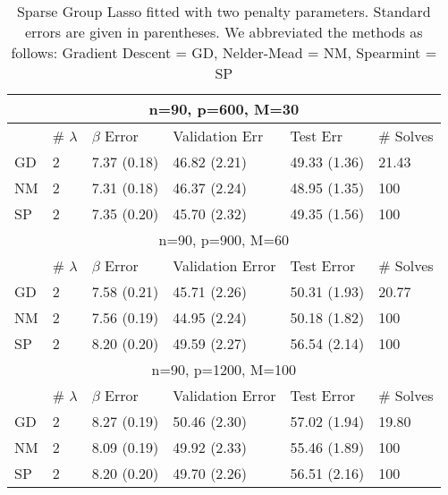 \documentclass[12pt,letterpaper]{article}
\begin{document}
\begin{table}
\caption{\label{table:two_param_sgl} Sparse Group Lasso fitted with two penalty parameters. Standard errors are given in parentheses. We abbreviated the methods as follows: Gradient Descent = GD, Nelder-Mead = NM, Spearmint = SP}
\centering
\begin{tabular}{| l | l | l | l | l | l | }
	\hline
	\multicolumn{6}{|c|}{n=90, p=600, M=30}\\
	\hline
	& \# $\lambda$ & $\beta$ Error & Validation Err & Test Err & \# Solves \\
	\hline
	GD & 2 & 7.37 (0.18) & 46.82 (2.21) & 49.33 (1.36)& 21.43\\
	\hline
	NM & 2 & 7.31 (0.18)  & 46.37 (2.24) & 48.95 (1.35) & 100 \\
	\hline
	SP & 2 & 7.35 (0.20) &  45.70 (2.32) & 49.35 (1.56) & 100 \\
	\hline
	\multicolumn{6}{|c|}{n=90, p=900, M=60}\\
	\hline
	& \# $\lambda$ & $\beta$ Error & Validation Error & Test Error & \# Solves \\
	\hline
	GD & 2 & 7.58 (0.21) & 45.71 (2.26) & 50.31 (1.93) & 20.77\\
	\hline
	NM & 2 & 7.56 (0.19) & 44.95 (2.24) & 50.18 (1.82) & 100  \\
	\hline
	SP & 2 & 8.20 (0.20)  & 49.59 (2.27) & 56.54 (2.14) & 100 \\
	\hline
	\multicolumn{6}{|c|}{n=90, p=1200, M=100}\\
	\hline
	& \# $\lambda$ & $\beta$ Error & Validation Error & Test Error & \# Solves \\
	\hline
	GD & 2 & 8.27 (0.19) & 50.46 (2.30) & 57.02 (1.94) & 19.80 \\
	\hline
	NM & 2 & 8.09 (0.19) & 49.92 (2.33) & 55.46 (1.89) & 100 \\
	\hline
	SP & 2 & 8.20 (0.20) & 49.70 (2.26) & 56.51 (2.16) & 100 \\
	\hline
\end{tabular}
\end{table}
\end{document}
